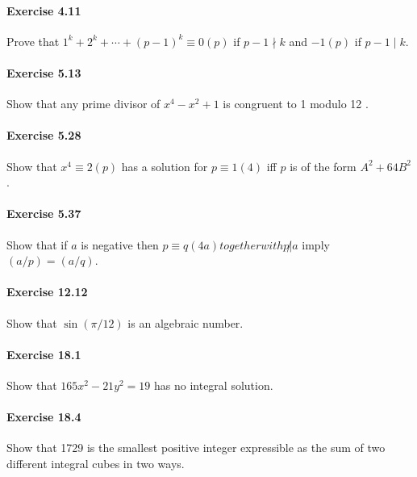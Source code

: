\documentclass{article}
\begin{document}
\paragraph{Exercise 4.11} Prove that $1^{k}+2^{k}+\cdots+(p-1)^{k} \equiv 0(p)$ if $p-1 \nmid k$ and $-1(p)$ if $p-1 \mid k$.


\paragraph{Exercise 5.13} Show that any prime divisor of $x^{4}-x^{2}+1$ is congruent to 1 modulo 12 .


\paragraph{Exercise 5.28} Show that $x^{4} \equiv 2(p)$ has a solution for $p \equiv 1(4)$ iff $p$ is of the form $A^{2}+64 B^{2}$.


\paragraph{Exercise 5.37} Show that if $a$ is negative then $p \equiv q(4 a) together with p\not | a$ imply $(a / p)=(a / q)$.


\paragraph{Exercise 12.12} Show that $\sin (\pi / 12)$ is an algebraic number.



\paragraph{Exercise 18.1} Show that $165 x^{2}-21 y^{2}=19$ has no integral solution.


\paragraph{Exercise 18.4} Show that 1729 is the smallest positive integer expressible as the sum of two different integral cubes in two ways.
\end{document}
